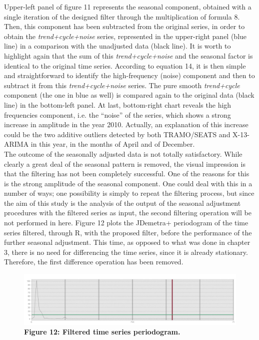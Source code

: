 \documentclass{article}
\begin{document}
Upper-left panel of figure 11 represents the seasonal component, obtained with a single iteration of the designed filter through the multiplication of formula 8. Then, this component has been subtracted from the original series, in order to obtain the \textit{trend+cycle+noise} series, represented in the upper-right panel (blue line) in a comparison with the unadjusted data (black line). It is worth to highlight again that the sum of this \textit{trend+cycle+noise} and the seasonal factor is identical to the original time series. According to equation 14, it is then simple and straightforward to identify the high-frequency (noise) component and then to subtract it from this \textit{trend+cycle+noise} series. The pure smooth \textit{trend+cycle} component (the one in blue as well) is compared again to the original data (black line) in the bottom-left panel. At last, bottom-right chart reveals the high frequencies component, i.e. the ``noise'' of the series, which shows a strong increase in amplitude in the year 2010. Actually, an explanation of this increase could be the two additive outliers detected by both TRAMO/SEATS and X-13-ARIMA in this year, in the months of April and of December.\\The outcome of the seasonally adjusted data is not totally satisfactory. While clearly a great deal of the seasonal pattern is removed, the visual impression is that the filtering has not been completely successful. One of the reasons for this is the strong amplitude of the seasonal component. One could deal with this in a number of ways; one possibility is simply to repeat the filtering process, but since the aim of this study is the analysis of the output of the seasonal adjustment procedures with the filtered series as input, the second filtering operation will be not performed in here. Figure 12 plots the JDemetra+ periodogram of the time series filtered, through R, with the proposed filter, before the performance of the further seasonal adjustment. This time, as opposed to what was done in chapter 3, there is no need for differencing the time series, since it is already stationary. Therefore, the first difference operation has been removed.\\ 
\begin{figure}[H]
\centering
  \includegraphics[width=\textwidth]{../images/capitolo4/tc_periodogram.jpg}
  {\textbf{\scriptsize Figure 12: Filtered time series periodogram.}}
\end{figure}
\end{document}
